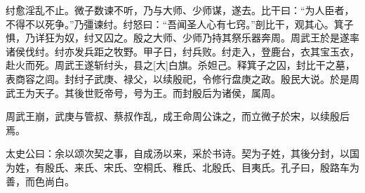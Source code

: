 \documentclass[UTF8,12pt,AutoFakeBold,fontset=fandol]{ctexart}
\begin{document}
	纣愈淫乱不止。微子数谏不听，乃与大师、少师谋，遂去。比干曰：“为人臣者，不得不以死争。”乃彊谏纣。纣怒曰：“吾闻圣人心有七窍。”剖比干，观其心。箕子惧，乃详狂为奴，纣又囚之。殷之大师、少师乃持其祭乐器奔周。周武王於是遂率诸侯伐纣。纣亦发兵距之牧野。甲子日，纣兵败。纣走入，登鹿台，衣其宝玉衣，赴火而死。周武王遂斩纣头，县之[大]白旗。杀妲己。释箕子之囚，封比干之墓，表商容之闾。封纣子武庚、禄父，以续殷祀，令修行盘庚之政。殷民大说。於是周武王为天子。其後世贬帝号，号为王。而封殷后为诸侯，属周。
	
	周武王崩，武庚与管叔、蔡叔作乱，成王命周公诛之，而立微子於宋，以续殷后焉。
	
	太史公曰：余以颂次契之事，自成汤以来，采於书诗。契为子姓，其後分封，以国为姓，有殷氏、来氏、宋氏、空桐氏、稚氏、北殷氏、目夷氏。孔子曰，殷路车为善，而色尚白。
	
	
	\pagebreak
	{}%
	\pagebreak
	
\end{document}
